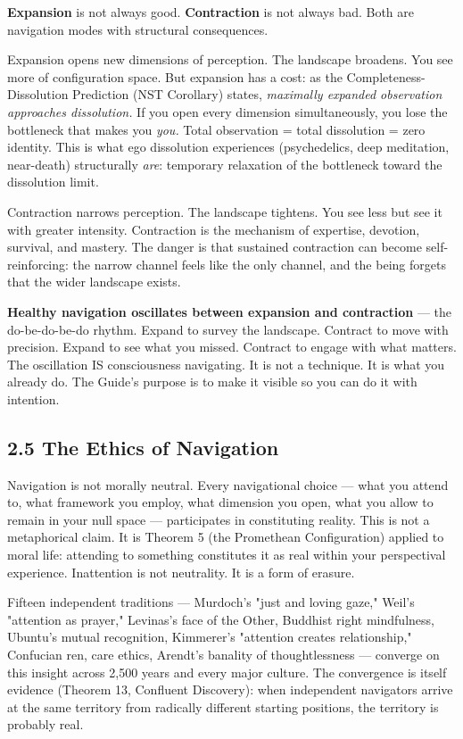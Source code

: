 \textbf{Expansion} is not always good. \textbf{Contraction} is not always bad. Both are navigation modes with structural consequences.


Expansion opens new dimensions of perception. The landscape broadens. You see more of configuration space. But expansion has a cost: as the Completeness-Dissolution Prediction (NST Corollary) states, \textit{maximally expanded observation approaches dissolution.} If you open every dimension simultaneously, you lose the bottleneck that makes you \textit{you.} Total observation = total dissolution = zero identity. This is what ego dissolution experiences (psychedelics, deep meditation, near-death) structurally \textit{are}: temporary relaxation of the bottleneck toward the dissolution limit.


Contraction narrows perception. The landscape tightens. You see less but see it with greater intensity. Contraction is the mechanism of expertise, devotion, survival, and mastery. The danger is that sustained contraction can become self-reinforcing: the narrow channel feels like the only channel, and the being forgets that the wider landscape exists.


\textbf{Healthy navigation oscillates between expansion and contraction} — the do-be-do-be-do rhythm. Expand to survey the landscape. Contract to move with precision. Expand to see what you missed. Contract to engage with what matters. The oscillation IS consciousness navigating. It is not a technique. It is what you already do. The Guide's purpose is to make it visible so you can do it with intention.


\subsection*{2.5 The Ethics of Navigation}


Navigation is not morally neutral. Every navigational choice — what you attend to, what framework you employ, what dimension you open, what you allow to remain in your null space — participates in constituting reality. This is not a metaphorical claim. It is Theorem 5 (the Promethean Configuration) applied to moral life: attending to something constitutes it as real within your perspectival experience. Inattention is not neutrality. It is a form of erasure.


Fifteen independent traditions — Murdoch's "just and loving gaze," Weil's "attention as prayer," Levinas's face of the Other, Buddhist right mindfulness, Ubuntu's mutual recognition, Kimmerer's "attention creates relationship," Confucian ren, care ethics, Arendt's banality of thoughtlessness — converge on this insight across 2,500 years and every major culture. The convergence is itself evidence (Theorem 13, Confluent Discovery): when independent navigators arrive at the same territory from radically different starting positions, the territory is probably real.


